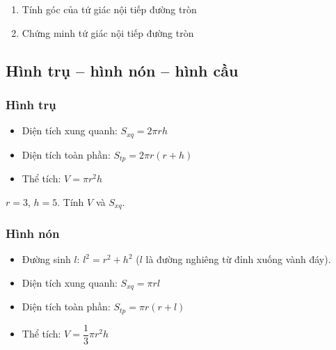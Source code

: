 \documentclass[12pt,a4paper]{article}
\begin{document}
\begin{enumerate}[label=\textbf{Dạng \arabic*:}, leftmargin=*, align=left]
  \item Tính góc của tứ giác nội tiếp đường tròn
  \item Chứng minh tứ giác nội tiếp đường tròn
\end{enumerate}

\subsection{Hình trụ -- hình nón -- hình cầu}

\subsubsection{Hình trụ}

\begin{congthuc}
  \begin{itemize}
    \item Diện tích xung quanh: $S_{xq} = 2\pi r h$
    \item Diện tích toàn phần: $S_{tp} = 2\pi r(r + h)$
    \item Thể tích: $V = \pi r^2 h$
  \end{itemize}
\end{congthuc}

\begin{vidu}
  $r = 3$, $h = 5$. Tính $V$ và $S_{xq}$.
\end{vidu}

\subsubsection{Hình nón}

\begin{congthuc}
  \begin{itemize}
    \item Đường sinh $l$: $l^2 = r^2 + h^2$ \quad ($l$ là đường nghiêng từ đỉnh xuống vành đáy).
    \item Diện tích xung quanh: $S_{xq} = \pi r l$
    \item Diện tích toàn phần: $S_{tp} = \pi r(r + l)$
    \item Thể tích: $V = \dfrac{1}{3}\pi r^2 h$
  \end{itemize}
\end{congthuc}
\end{document}
